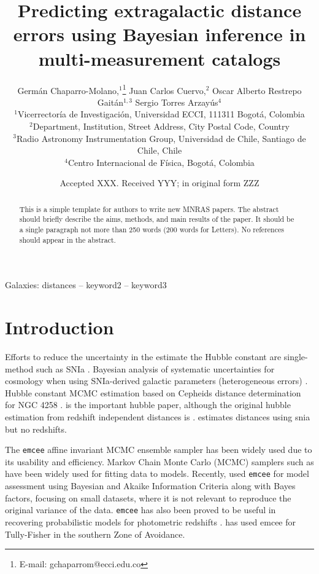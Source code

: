 \documentclass[a4paper,fleqn,usenatbib]{mnras}
\title[Predicting extragalactic distance errors]{Predicting extragalactic distance errors using Bayesian inference in multi-measurement catalogs}
\author[G. Chaparro-Molano et al.]{Germ\'an Chaparro-Molano,$^{1}$\thanks{E-mail: gchaparrom@ecci.edu.co}
Juan Carlos Cuervo,$^{2}$
Oscar Alberto Restrepo Gait\'an$^{1,3}$ \newauthor
Sergio Torres Arzay\'{u}s$^{4}$
\\
$^{1}$Vicerrector\'ia de Investigaci\'on, Universidad ECCI, 111311 Bogot\'a, Colombia\\
$^{2}$Department, Institution, Street Address, City Postal Code, Country\\
$^{3}$Radio Astronomy Instrumentation Group, Universidad de Chile, Santiago de Chile, Chile\\
$^{4}$Centro Internacional de F\'isica, Bogot\'a, Colombia
}
\date{Accepted XXX. Received YYY; in original form ZZZ}
\begin{document}
\label{firstpage}
\pagerange{\pageref{firstpage}--\pageref{lastpage}}
\maketitle

\begin{abstract}
This is a simple template for authors to write new MNRAS papers.
The abstract should briefly describe the aims, methods, and main results of the paper.
It should be a single paragraph not more than 250 words (200 words for Letters).
No references should appear in the abstract.
\end{abstract}

\begin{keywords}
Galaxies: distances -- keyword2 -- keyword3
\end{keywords}



\section{Introduction}

Efforts to reduce the uncertainty in the estimate the Hubble constant are single-method such as SNIa \citet{hubsn2018}. Bayesian analysis of systematic uncertainties for cosmology when using SNIa-derived galactic parameters (heterogeneous errors) \citet{unity}. Hubble constant MCMC estimation based on Cepheids distance determination for NGC 4258 \citet{hubngc}. \citet{hub2010} is the important hubble paper, although the original hubble estimation from redshift independent distances is \citet{huborig}. \citet{ridsn} estimates distances using snia but no redshifts. 

The \texttt{emcee} affine invariant MCMC ensemble sampler \citet{emcee} has been widely used due to its usability and efficiency. Markov Chain Monte Carlo (MCMC) samplers such as \citet{emcee} have been widely used for fitting data to models. Recently, \citet{propprob2018} used \texttt{emcee} for model assessment using Bayesian and Akaike Information Criteria along with Bayes factors, focusing on small datasets, where it is not relevant to reproduce the original variance of the data. \texttt{emcee} has also been proved to be useful in recovering probabilistic models for photometric redshifts \citet{photred1,photred2} . \citet{said} has used emcee for Tully-Fisher in the southern Zone of Avoidance.
\end{document}
